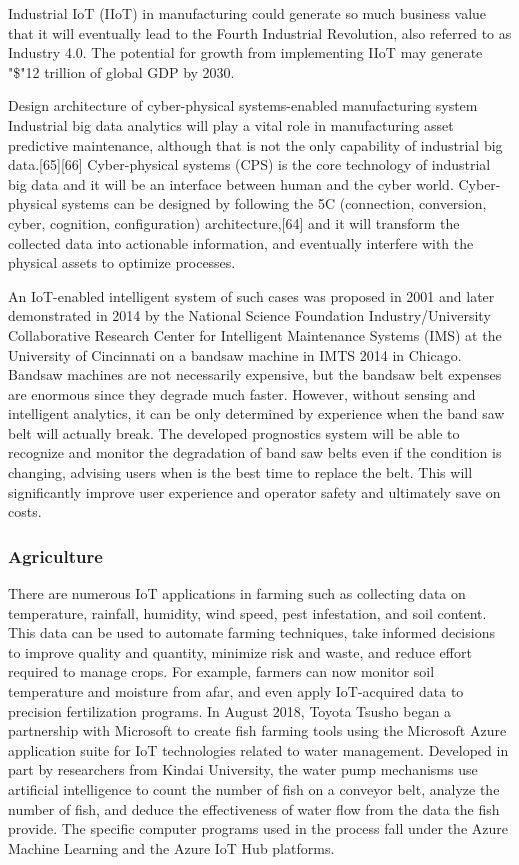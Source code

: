 \documentclass[12pt, a4paper, twoside]{article}
\begin{document}
Industrial IoT (IIoT) in manufacturing could generate so much business value that it will eventually lead to the Fourth Industrial Revolution, also referred to as Industry 4.0. The potential for growth from implementing IIoT may generate "\$"12 trillion of global GDP by 2030.

Design architecture of cyber-physical systems-enabled manufacturing system
Industrial big data analytics will play a vital role in manufacturing asset predictive maintenance, although that is not the only capability of industrial big data.[65][66] Cyber-physical systems (CPS) is the core technology of industrial big data and it will be an interface between human and the cyber world. Cyber-physical systems can be designed by following the 5C (connection, conversion, cyber, cognition, configuration) architecture,[64] and it will transform the collected data into actionable information, and eventually interfere with the physical assets to optimize processes.

An IoT-enabled intelligent system of such cases was proposed in 2001 and later demonstrated in 2014 by the National Science Foundation Industry/University Collaborative Research Center for Intelligent Maintenance Systems (IMS) at the University of Cincinnati on a bandsaw machine in IMTS 2014 in Chicago. Bandsaw machines are not necessarily expensive, but the bandsaw belt expenses are enormous since they degrade much faster. However, without sensing and intelligent analytics, it can be only determined by experience when the band saw belt will actually break. The developed prognostics system will be able to recognize and monitor the degradation of band saw belts even if the condition is changing, advising users when is the best time to replace the belt. This will significantly improve user experience and operator safety and ultimately save on costs.

\subsubsection{Agriculture}
There are numerous IoT applications in farming such as collecting data on temperature, rainfall, humidity, wind speed, pest infestation, and soil content. This data can be used to automate farming techniques, take informed decisions to improve quality and quantity, minimize risk and waste, and reduce effort required to manage crops. For example, farmers can now monitor soil temperature and moisture from afar, and even apply IoT-acquired data to precision fertilization programs.
In August 2018, Toyota Tsusho began a partnership with Microsoft to create fish farming tools using the Microsoft Azure application suite for IoT technologies related to water management. Developed in part by researchers from Kindai University, the water pump mechanisms use artificial intelligence to count the number of fish on a conveyor belt, analyze the number of fish, and deduce the effectiveness of water flow from the data the fish provide. The specific computer programs used in the process fall under the Azure Machine Learning and the Azure IoT Hub platforms.
\end{document}
